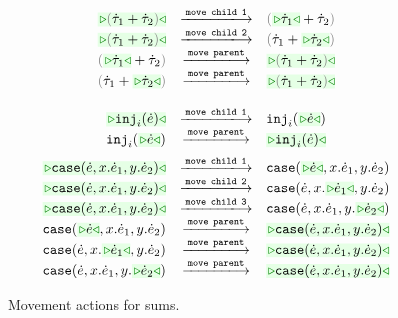 \begin{figure}
\begin{displaymath}
\begin{array}{@{}rcl}
  \TABperformMove
      {\zwsel{\tsum{\htau_1}{\htau_2}}}
      {\aMove{\dChildn{1}}}
      {      {\tsum{\zwsel{\htau_1}}{\htau_2}}}
  \\
  \TABperformMove
      {\zwsel{\tsum{\htau_1}{\htau_2}}}
      {\aMove{\dChildn{2}}}
      {      {\tsum{\htau_1}{\zwsel{\htau_2}}}}
  \\
  \TABperformMove
      {      {\tsum{\zwsel{\htau_1}}{\htau_2}}}
      {\aMove{\dParent}}
      {\zwsel{\tsum{{\htau_1}}{{\htau_2}}}}
  \\
  \TABperformMove
      {      {\tsum{{\htau_1}}{{\zwsel{\htau_2}}}}}
      {\aMove{\dParent}}
      {\zwsel{\tsum{{\htau_1}}{\htau_2}}}
  \\[2mm]
\end{array}
\end{displaymath}
\begin{displaymath}
\begin{array}{@{}rcl}
  \TABperformMove
      {\zwsel{\hinj{i}{\hexp}}}
      {\aMove{\dChildn{1}}}
      {\hinj{i}{\zwsel{\hexp}}}
  \\
  \TABperformMove
      {\hinj{i}{\zwsel{\hexp}}}
      {\aMove{\dParent}}
      {\zwsel{\hinj{i}{\hexp}}}
  \\[2mm]
  \TABperformMove
      {\zwsel{\hcase{\hexp}{x}{\hexp_1}{y}{\hexp_2}}}
      {\aMove{\dChildn{1}}}
      {      {\hcase{\zwsel{\hexp}}{x}{\hexp_1}{y}{\hexp_2}}}
  \\
  \TABperformMove
      {\zwsel{\hcase{\hexp}{x}{\hexp_1}{y}{\hexp_2}}}
      {\aMove{\dChildn{2}}}
      {      {\hcase{\hexp}{x}{\zwsel{\hexp_1}}{y}{\hexp_2}}}
  \\
  \TABperformMove
      {\zwsel{\hcase{\hexp}{x}{\hexp_1}{y}{\hexp_2}}}
      {\aMove{\dChildn{3}}}
      {      {\hcase{\hexp}{x}{\hexp_1}{y}{\zwsel{\hexp_2}}}}
  \\
  \TABperformMove
      {      {\hcase{\zwsel{\hexp}}{x}{\hexp_1}{y}{\hexp_2}}}
      {\aMove{\dParent}}
      {\zwsel{\hcase{{\hexp}}{x}{\hexp_1}{y}{\hexp_2}}}
  \\
  \TABperformMove
      {      {\hcase{{\hexp}}{x}{\zwsel{\hexp_1}}{y}{\hexp_2}}}
      {\aMove{\dParent}}
      {\zwsel{\hcase{{\hexp}}{x}{\hexp_1}{y}{\hexp_2}}}
  \\
  \TABperformMove
      {      {\hcase{{\hexp}}{x}{\hexp_1}{y}{\zwsel{\hexp_2}}}}
      {\aMove{\dParent}}
      {\zwsel{\hcase{{\hexp}}{x}{\hexp_1}{y}{\hexp_2}}}
\end{array}
\end{displaymath}
\caption{Movement actions for sums.}
\label{fig:sum-move}
\end{figure}

